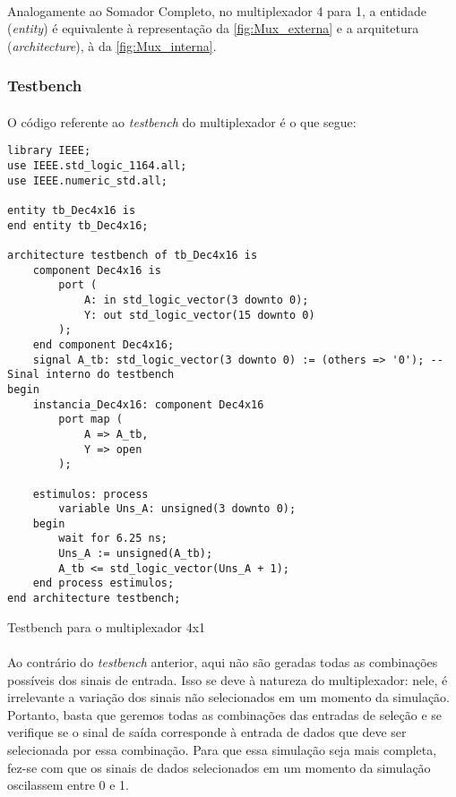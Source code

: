 \documentclass[a4paper,12pt]{article}
\newenvironment{code}{\captionsetup{type=listing}}{}
\begin{document}
\paragraph{}
Analogamente ao Somador Completo, no multiplexador 4 para 1, a entidade (\textit{entity}) é equivalente à representação da \autoref{fig:Mux_externa} e a arquitetura (\textit{architecture}), à da \autoref{fig:Mux_interna}.

\subsubsection{Testbench}
\paragraph{}
O código referente ao \textit{testbench} do multiplexador é o que segue:

\begin{code}
\begin{verbatim}
library IEEE;
use IEEE.std_logic_1164.all;
use IEEE.numeric_std.all;

entity tb_Dec4x16 is
end entity tb_Dec4x16;

architecture testbench of tb_Dec4x16 is
    component Dec4x16 is
        port (
            A: in std_logic_vector(3 downto 0);
            Y: out std_logic_vector(15 downto 0)
        );
    end component Dec4x16;
    signal A_tb: std_logic_vector(3 downto 0) := (others => '0'); -- Sinal interno do testbench
begin
    instancia_Dec4x16: component Dec4x16
        port map (
            A => A_tb,
            Y => open
        );

    estimulos: process
        variable Uns_A: unsigned(3 downto 0);
    begin
        wait for 6.25 ns;
        Uns_A := unsigned(A_tb);
        A_tb <= std_logic_vector(Uns_A + 1);
    end process estimulos;
end architecture testbench;
\end{verbatim}
\caption{Testbench para o multiplexador 4x1}
\end{code}

\paragraph{}
Ao contrário do \textit{testbench} anterior, aqui não são geradas todas as combinações possíveis dos sinais de entrada. Isso se deve à natureza do multiplexador: nele, é irrelevante a variação dos sinais não selecionados em um momento da simulação. Portanto, basta que geremos todas as combinações das entradas de seleção e se verifique se o sinal de saída corresponde à entrada de dados que deve ser selecionada por essa combinação. Para que essa simulação seja mais completa, fez-se com que os sinais de dados selecionados em um momento da simulação oscilassem entre 0 e 1.
\end{document}
